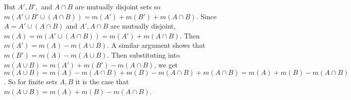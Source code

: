 \documentclass[11pt]{article}
\begin{document}
\begin{exercise}{7}{14}
{        But $A', B',$ and $A \cap B$ are mutually disjoint sets so $m(A' \cup B' \cup (A \cap B)) = m(A') + m(B') + m(A \cap B)$. \parspace
        Since $A = A' \cup (A \cap B)$ and $A', A \cap B$ are mutually disjoint, $m(A) = m(A' \cup (A \cap B)) = m(A') + m(A \cap B)$.
        Then $m(A') = m(A) - m(A \cup B)$.
        A similar argument shows that $m(B') = m(A) - m(A \cup B)$.
        Then substituting into $m(A \cup B) = m(A') + m(B') - m(A \cap B)$, we get $m(A \cup B) = m(A) - m(A \cap B) + m(B) - m(A \cap B) + m(A \cap B) = m(A) + m(B) - m(A \cap B)$.
        So for finite sets $A,B$ it is the case that $m(A \cup B) = m(A) + m(B) - m(A \cap B)$.
    }
\end{exercise}

\end{document}
